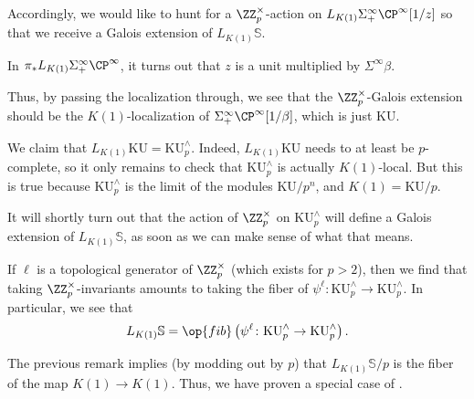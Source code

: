 \documentclass[../notes.tex]{subfiles}
\begin{document}
Accordingly, we would like to hunt for a $\ZZ_p^\times$-action on $L_{K(1)}\Sigma^\infty_+\CP^\infty[1/z]$ so that we receive a Galois extension of $L_{K(1)}\mathbb S$.
\begin{remark}
	In $\pi_*L_{K(1)}\Sigma^\infty_+\CP^\infty$, it turns out that $z$ is a unit multiplied by $\Sigma^\infty\beta$.
\end{remark}
Thus, by passing the localization through, we see that the $\ZZ_p^\times$-Galois extension should be the $K(1)$-local\-ization of $\Sigma_+^\infty\CP^\infty[1/\beta]$, which is just $\mathrm{KU}$.
\begin{remark}
	We claim that $L_{K(1)}\mathrm{KU}=\mathrm{KU}^\land_p$. Indeed, $L_{K(1)}\mathrm{KU}$ needs to at least be $p$-complete, so it only remains to check that $\mathrm{KU}^\land_p$ is actually $K(1)$-local. But this is true because $\mathrm{KU}^\land_p$ is the limit of the modules $\mathrm{KU}/p^n$, and $K(1)=\mathrm{KU}/p$.
\end{remark}
It will shortly turn out that the action of $\ZZ_p^\times$ on $\mathrm{KU}^\land_p$ will define a Galois extension of $L_{K(1)}\mathbb S$, as soon as we can make sense of what that means.
\begin{remark}
	If $\ell$ is a topological generator of $\ZZ_p^\times$ (which exists for $p>2$), then we find that taking $\ZZ_p^\times$-invariants amounts to taking the fiber of $\psi^\ell\colon\mathrm{KU}^\land_p\to\mathrm{KU}^\land_p$. In particular, we see that
	\[L_{K(1)}\mathbb S=\op{fib}\left(\psi^\ell\colon\mathrm{KU}^\land_p\to\mathrm{KU}^\land_p\right).\]
\end{remark}
The previous remark implies (by modding out by $p$) that $L_{K(1)}\mathbb S/p$ is the fiber of the map $K(1)\to K(1)$. Thus, we have proven a special case of .
\end{document}
